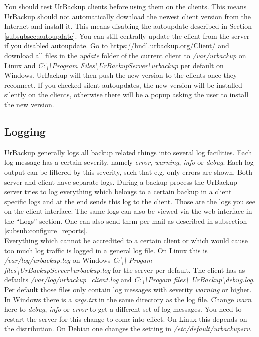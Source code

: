 \documentclass[a4paper,10pt]{article}
\begin{document}
You should test UrBackup clients before using them on the clients. This means
UrBackup should not automatically download the newest client version from
the Internet and install it. This means disabling the autoupdate described in
Section \ref{subsubsec:autoupdate}. You can still centrally update the client
from the server if you disabled autoupdate. Go to \url{https://hndl.urbackup.org/Client/}
and download all files in the \textsl{update} folder of the current client to \textsl{/var/urbackup} on Linux and
\textsl{C:\textbackslash\textbackslash Program Files\textbackslash UrBackupServer\textbackslash urbackup} per default on Windows. UrBackup
will then push the new version to the clients once they reconnect. If you checked
silent autoupdates, the new version will be installed silently on the clients, otherwise
there will be a popup asking the user to install the new version.

\subsection{Logging}
\label{sec:logging}

UrBackup generally logs all backup related things into several log facilities.
Each log message has a certain severity, namely \textsl{error},
\textsl{warning}, \textsl{info} or \textsl{debug}.
Each log output can be filtered by this severity, such that e.g. only errors are
shown. Both server and client have separate logs. During a backup process the
UrBackup server tries to log everything which belongs to a certain backup in a
client specific logs and at the end sends this log to the client. Those are the
logs you see on the client interface. The same logs can also be viewed via the
web interface in the ``Logs'' section. One can also send them per mail as
described in subsection \ref{subsub:configure_reports}.\\
Everything which cannot be accredited to a certain client or which would cause
too much log traffic is logged in a general log file. On Linux this is
\textsl{/var/log/urbackup.log} on Windows \textsl{C:\textbackslash\textbackslash
Progam files\textbackslash UrBackupServer\textbackslash urbackup.log} for the
server per default.  The client has as defaults
\textsl{/var/log/urbackup\_client.log} and
\textsl{C:\textbackslash\textbackslash Progam files\textbackslash
UrBackup\textbackslash debug.log}. Per default those files only contain log
messages with severity \textsl{warning} or higher. In Windows there is a
\textsl{args.txt} in the same directory as the log file. Change \textsl{warn}
here to \textsl{debug}, \textsl{info} or \textsl{error} to get a different set
of log messages. You need to restart the server for this change to come into
effect. On Linux this depends on the distribution. On Debian one changes the
setting in \textsl{/etc/default/urbackupsrv}.
\end{document}
